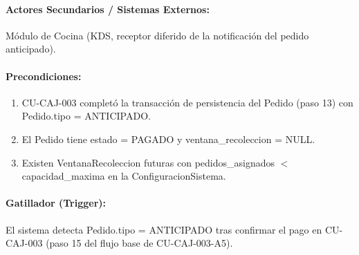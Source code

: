 \paragraph{Actores Secundarios / Sistemas Externos:} Módulo de Cocina (KDS, receptor diferido de la notificación del pedido anticipado).

\paragraph{Precondiciones:}
\begin{enumerate}
    \item[I.] CU-CAJ-003 completó la transacción de persistencia del Pedido (paso 13) con Pedido.tipo = ANTICIPADO.
    \item[II.] El Pedido tiene estado = PAGADO y ventana\_recoleccion = NULL.
    \item[III.] Existen VentanaRecoleccion futuras con pedidos\_asignados $<$ capacidad\_maxima en la ConfiguracionSistema.
\end{enumerate}

\paragraph{Gatillador (Trigger):} El sistema detecta Pedido.tipo = ANTICIPADO tras confirmar el pago en CU-CAJ-003 (paso 15 del flujo base de CU-CAJ-003-A5).

